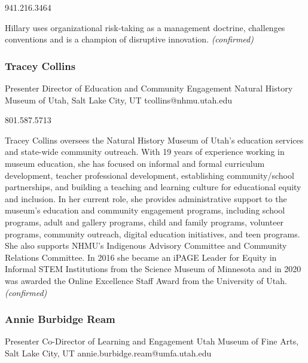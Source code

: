 \documentclass{report}
\begin{document}
                941.216.3464\newline

                Hillary uses organizational risk-taking as a management doctrine, challenges conventions and is a champion of disruptive innovation.
                \emph{ (confirmed) }
              

              
                \subsubsection*{ Tracey  Collins }
                Presenter\newline
                Director of Education and Community Engagement\newline
                Natural History Museum of Utah, Salt Lake City, UT
                \newline
                tcollins@nhmu.utah.edu\newline
                
                801.587.5713\newline

                Tracey Collins oversees the Natural History Museum of Utah’s education services and state-wide community outreach. With 19 years of experience working in museum education, she has focused on informal and formal curriculum development, teacher professional development, establishing community/school partnerships, and building a teaching and learning culture for educational equity and inclusion. In her current role, she provides administrative support to the museum’s education and community engagement programs, including school programs, adult and gallery programs, child and family programs, volunteer programs, community outreach, digital education initiatives, and teen programs. She also supports NHMU’s Indigenous Advisory Committee and Community Relations Committee. In 2016 she became an iPAGE Leader for Equity in Informal STEM Institutions from the Science Museum of Minnesota and in 2020 was awarded the Online Excellence Staff Award from the University of Utah.
                \emph{ (confirmed) }
              

              
                \subsubsection*{ Annie  Burbidge Ream }
                Presenter\newline
                Co-Director of Learning and Engagement\newline
                Utah Museum of Fine Arts, Salt Lake City, UT
                \newline
                annie.burbidge.ream@umfa.utah.edu\newline
                
\end{document}
